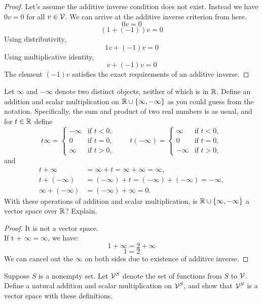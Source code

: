 \begin{proof}
	Let's assume the additive inverse condition does not exist. Instead we have $0v = 0$ for all $v \in \mathcal{V}$. We can arrive at the additive inverse criterion from here.
	$$0v = 0$$
	$$(1+(-1))v = 0$$
	Using distributivity,
	$$1v + (-1)v = 0$$
	Using multiplicative identity,
	$$v + (-1)v = 0$$
	The element $(-1)v$ satisfies the exact requirements of an additive inverse.
\end{proof}
\begin{question}
	Let $\infty$ and $-\infty$ denote two distinct objects, neither of which is in $\mathbb{R}$. Define an addition and scalar multiplication on $\mathbb{R} \cup \{\infty, -\infty\}$ as you could guess from the notation. Specifically, the sum and product of two real numbers is as usual, and for $t \in \mathbb{R}$ define
	\[
	t\infty = \begin{cases} 
		-\infty & \text{if } t < 0, \\
		0 & \text{if } t = 0, \\
		\infty & \text{if } t > 0,
	\end{cases}
	\qquad
	t(-\infty) = \begin{cases} 
		\infty & \text{if } t < 0, \\
		0 & \text{if } t = 0, \\
		-\infty & \text{if } t > 0,
	\end{cases}
	\]
	and
	\begin{align*}
		t + \infty &= \infty + t = \infty + \infty = \infty, \\
		t + (-\infty) &= (-\infty) + t = (-\infty) + (-\infty) = -\infty, \\
		\infty + (-\infty) &= (-\infty) + \infty = 0.
	\end{align*}
	With these operations of addition and scalar multiplication, is $\mathbb{R} \cup \{\infty, -\infty\}$ a vector space over $\mathbb{R}$? Explain.
\end{question}
\begin{proof}
	It is not a vector space.\\
	If t + $\infty = \infty$, we have:
	$$1 + \infty = 2 + \infty$$
	$$1=2$$
	We can cancel out the $\infty$ on both sides due to existence of additive inverse.
\end{proof}
\begin{question}
	Suppose $S$ is a nonempty set. Let $\mathcal{V}^S$ denote the set of functions from $S$ to $\mathcal{V}$. Define a natural addition and scalar multiplication on $\mathcal{V}^S$, and show that $\mathcal{V}^S$ is a vector space with these definitions.   
\end{question}
